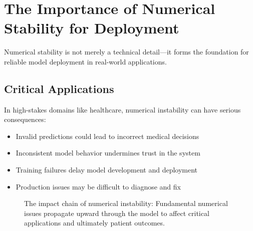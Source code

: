 \section{The Importance of Numerical Stability for Deployment}

Numerical stability is not merely a technical detail—it forms the foundation for reliable model deployment in real-world applications.

\subsection{Critical Applications}

In high-stakes domains like healthcare, numerical instability can have serious consequences:

\begin{itemize}
    \item Invalid predictions could lead to incorrect medical decisions
    \item Inconsistent model behavior undermines trust in the system
    \item Training failures delay model development and deployment
    \item Production issues may be difficult to diagnose and fix
\end{itemize}

\begin{figure}[htbp]
    \centering
    \caption{The impact chain of numerical instability: Fundamental numerical issues propagate upward through the model to affect critical applications and ultimately patient outcomes.}
    \label{fig:stability-impact}
\end{figure}

